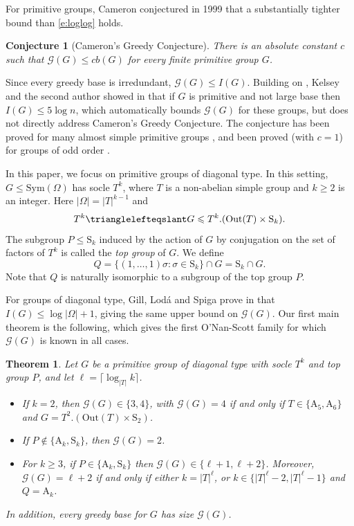 \documentclass[twoside,a4paper,reqno,11pt]{amsart}
\newcommand{\normeq}{\trianglelefteqslant}
\newcommand{\<}{\langle}
\renewcommand{\>}{\rangle}
\newcommand{\leqs}{\leqslant}
\newcommand{\geqs}{\geqslant}
\newcommand{\Out}{\mathrm{Out}}
\newcommand{\Sn}{\mathrm{S}}
\newcommand{\An}{\mathrm{A}}
\newtheorem{theorem}{Theorem}
\newtheorem*{conj*}{Conjecture}
\theoremstyle{definition}
\begin{document}
For primitive groups, Cameron conjectured in 1999 \cite{CameronBook} that a substantially tighter bound than \eqref{e:loglog} holds.
\begin{conj*}[Cameron's Greedy Conjecture]
    There is an absolute constant $c$ such that $\mathcal{G}(G)\leqs cb(G)$ for every finite primitive group $G$.
\end{conj*}

Since every greedy base is irredundant, $\mathcal{G}(G) \leqs I(G)$. Building on \cite{GillLodaSpiga}, Kelsey and the second author showed in \cite{KelseyCMRD} that if $G$ is primitive and not large base then $I(G) \leqs 5 \log n$, which automatically bounds $\mathcal{G}(G)$ for these groups,  but does not directly address Cameron's Greedy Conjecture. The conjecture has been proved for many almost simple primitive groups \cite{d_greedy,dR_greedy}, and been proved (with  $c = 1$) for groups of odd order \cite{BdR_odd}.

In this paper, we focus on primitive groups of diagonal type. In this setting, $G\leqs \mathrm{Sym}(\Omega)$ has socle $T^k$, where $T$ is a non-abelian simple group and $k\geqs 2$ is an integer. Here $|\Omega| = |T|^{k-1}$ and 
\begin{equation*}
    T^k\normeq G\leqs T^k.(\Out(T)\times \Sn_k).
\end{equation*}
The subgroup $P\leqs \Sn_k$ induced by the action of $G$ by conjugation on the set of factors of $T^k$ is called the \textit{top group} of $G$. We  define
\begin{equation*}%
    Q = \{(1,\dots,1)\sigma : \sigma\in \Sn_k\} \cap G = \Sn_k \cap G.
\end{equation*}
Note that $Q$ is naturally isomorphic to a subgroup of the top group $P$.


For groups of diagonal type, Gill, Lod\'a and Spiga prove in \cite{GillLodaSpiga} that $I(G) \leqs \log |\Omega| + 1$, giving the same upper bound on $\mathcal{G}(G)$.  Our first main theorem is the following, which gives the first O'Nan-Scott family for which $\mathcal{G}(G)$ is known in all cases. 
\begin{theorem}\label{thm:greedy}
    Let $G$ be a primitive group of diagonal type with socle $T^k$ and top group $P$, and let $\ell  = \lceil \log_{|T|} k \rceil$. %
    \begin{itemize}\addtolength{\itemsep}{0.2\baselineskip}
		\item[{\rm (i)}] If $k = 2$, then $\mathcal{G}(G)\in\{3,4\}$, with $\mathcal{G}(G) = 4$ if and only if $T\in\{ \An_5, \An_6\}$ and $G = T^2.(\Out(T)\times \Sn_2)$.
		\item[{\rm (ii)}] If $P\notin \{\An_k, \Sn_k\}$, then $\mathcal{G}(G) = 2$.
		\item[{\rm (iii)}] For $k\geqs 3$, if $P\in\{ \An_k, \Sn_k\}$ then $\mathcal{G}(G)\in\{\ell+1,\ell+2\}$. Moreover, $\mathcal{G}(G) = \ell+2$ if and only if either $k = |T|^\ell$, or $k\in\{|T|^\ell-2,|T|^\ell-1\}$ and $Q = \An_k$.
	\end{itemize}
    In addition, every greedy base for $G$ has size $\mathcal{G}(G)$.
\end{theorem}
\end{document}
